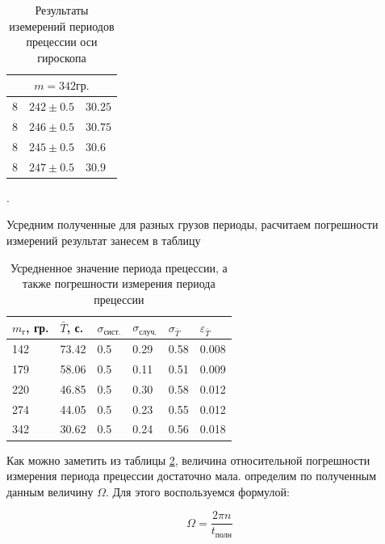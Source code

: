 \documentclass[a4paper, 12pt]{article}
\newcounter{Points}
\newcommand{\point}{\arabic{Points}. \addtocounter{Points}{1}}
\begin{document}
\begin{table}
\begin{tabular}{|l|l|l|}
    \multicolumn{3}{|c|}{$m = 342 гр.$}                     \\ \hline
    8   &   $242 \pm 0.5$   &   $30.25$                     \\ \hline
    8   &   $246 \pm 0.5$   &   $30.75$                     \\ \hline
    8   &   $245 \pm 0.5$   &   $30.6 $                     \\ \hline
    8   &   $247 \pm 0.5$   &   $30.9 $                     \\ \hline

    \end{tabular}
	\caption{Результаты иземерений периодов прецессии оси гироскопа}
    \label{tabl:data_row}
\end{table}

\point Усредним полученные для разных грузов периоды, расчитаем погрешности измерений результат занесем в таблицу \label{tabl:data_2}

\begin{table}
    \centering
    \begin{tabular}{|l|l|l|l|l|l|}
    \hline
    $m_г$, гр. & $\bar{T}$, с. & $\sigma_{сист.}$ &  $\sigma_{случ.}$ &  $\sigma_{\bar{T}}$ & $\varepsilon_{\bar{T}}$ \\ \hline
    142 & 73.42 & 0.5 & 0.29 & 0.58 & 0.008 \\ \hline
    179 & 58.06 & 0.5 & 0.11 & 0.51 & 0.009 \\ \hline
    220 & 46.85 & 0.5 & 0.30 & 0.58 & 0.012 \\ \hline
    274 & 44.05 & 0.5 & 0.23 & 0.55 & 0.012 \\ \hline
    342 & 30.62 & 0.5 & 0.24 & 0.56 & 0.018 \\ \hline

    \end{tabular}
	\caption{Усредненное значение периода прецессии, а также погрешности измерения периода прецессии}
    \label{tabl:mean_periods}
\end{table}

Как можно заметить из таблицы \ref{tabl:mean_periods}, величина относительной погрешности измерения периода прецессии достаточно мала. определим по полученным данным величину $\Omega$. Для этого воспользуемся формулой:

\begin{equation}
	\Omega = \frac{2\pi n}{t_{\text{полн}}}
	\label{eq:definition_Omega}
\end{equation} 
	
\end{document}
